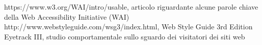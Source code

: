 \documentclass[a4paper]{article}
\begin{document}
\begin{thebibliography}{9}
	https://www.w3.org/WAI/intro/usable, articolo riguardante alcune parole chiave della Web Accessibility Initiative (WAI)
  http://www.webstyleguide.com/wsg3/index.html, Web Style Guide 3rd Edition
	Eyetrack III, studio comportamentale sullo sguardo dei visitatori dei siti web
\end{thebibliography}
\end{document}

